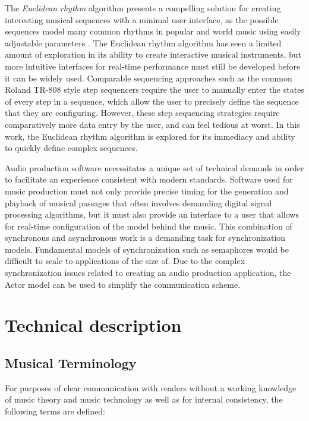 \documentclass{sig-alternate-05-2015}
\begin{document}
The \textit{Euclidean rhythm} algorithm presents a compelling solution for creating interesting musical sequences with a minimal user interface, as the possible sequences model many common rhythms in popular and world music using easily adjustable parameters \cite{toussaint2005euclidean}. The Euclidean rhythm algorithm has seen a limited amount of exploration in its ability to create interactive musical instruments, but more intuitive interfaces for real-time performance must still be developed before it can be widely used. Comparable sequencing approaches such as the common Roland TR-808 style step sequencers require the user to manually enter the states of every step in a sequence, which allow the user to precisely define the sequence that they are configuring. However, these step sequencing strategies require comparatively more data entry by the user, and can feel tedious at worst. In this work, the Euclidean rhythm algorithm is explored for its immediacy and ability to quickly define complex sequences.

Audio production software necessitates a unique set of technical demands in order to facilitate an experience consistent with modern standards. Software used for music production must not only provide precise timing for the generation and playback of musical passages that often involves demanding digital signal processing algorithms, but it must also provide an interface to a user that allows for real-time configuration of the model behind the music. This combination of synchronous and asynchronous work is a demanding task for synchronization models. Fundamental models of synchronization such as semaphores would be difficult to scale to applications of the size of. Due to the complex synchronization issues related to creating an audio production application, the Actor model can be used to simplify the communication scheme. 

\section{Technical description}

\subsection{Musical Terminology}
For purposes of clear communication with readers without a working knowledge of music theory and music technology as well as for internal consistency, the following terms are defined:
\end{document}
